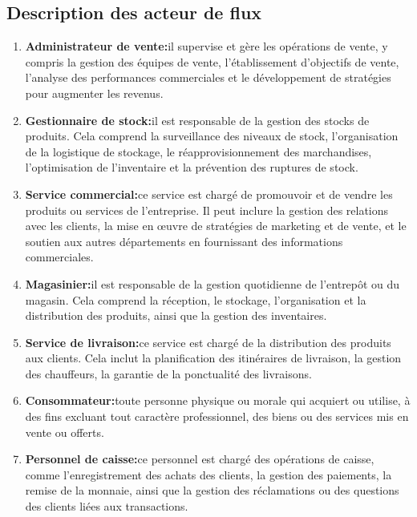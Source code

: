 \documentclass[edit,12pt,a4paper,ChapStyle,oneside,doubleinterligne]{report}
\begin{document}
\subsection{Description des acteur de flux}
\begin{enumerate}
    \item\textbf{Administrateur de vente:}il supervise et gère les opérations de vente, y compris la gestion des équipes de vente, l'établissement d'objectifs de vente, l'analyse des performances commerciales et le développement de stratégies pour augmenter les revenus\cite{Administrateur}.
    \item\textbf{Gestionnaire de stock:}il est responsable de la gestion des stocks de produits. Cela comprend la surveillance des niveaux de stock, l'organisation de la logistique de stockage, le réapprovisionnement des marchandises, l'optimisation de l'inventaire et la prévention des ruptures de stock\cite{Gestionnaire}.
    \item\textbf{Service commercial:}ce service est chargé de promouvoir et de vendre les produits ou services de l'entreprise. Il peut inclure la gestion des relations avec les clients, la mise en œuvre de stratégies de marketing et de vente, et le soutien aux autres départements en fournissant des informations commerciales\cite{Service}.
    \item\textbf{Magasinier:}il est responsable de la gestion quotidienne de l'entrepôt ou du magasin. Cela comprend la réception, le stockage, l'organisation et la distribution des produits, ainsi que la gestion des inventaires\cite{Magasinier}.
    \item\textbf{Service de livraison:}ce service est chargé de la distribution des produits aux clients. Cela inclut la planification des itinéraires de livraison, la gestion des chauffeurs, la garantie de la ponctualité des livraisons\cite{logistique}.
    \item\textbf{Consommateur:}toute personne physique ou morale qui acquiert ou utilise, à des fins excluant tout caractère professionnel, des biens ou des services mis en vente ou offerts\cite{Consommateur}.
    \item \textbf{Personnel de caisse:}ce personnel est chargé des opérations de caisse, comme l'enregistrement des achats des clients, la gestion des paiements, la remise de la monnaie, ainsi que la gestion des réclamations ou des questions des clients liées aux transactions\cite{Personnel}.
\end{enumerate}
\end{document}
